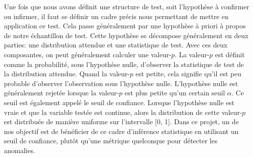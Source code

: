 \noindent Une fois que nous avons définit une structure de test, soit l'hypothèse à confirmer ou infirmer, il faut se définir un cadre précis nous permettant de mettre en application ce test. Cela passe généralement par une hypothèse à priori à propos de notre échantillon de test. Cette hypothèse se décompose généralement en deux parties: une distribution attendue et une statistique de test. Avec ces deux composantes, on peut généralement calculer une valeur-$p$. La valeur-$p$ est définit comme la probabilité, sous l'hypothèse nulle, d'observer la statistique de test de la distribution attendue. Quand la valeur-$p$ est petite, cela signifie qu'il est peu probable d'observer l'observation sous l'hypothèse nulle. L'hypothèse nulle est généralement rejetée lorsque la valeur-$p$ est plus petite qu'un certain seuil $\alpha$. Ce seuil est également appelé le seuil de confiance. Lorsque l'hypothèse nulle est vraie et que la variable testée est continue, alors la distribution de cette valeur-$p$ est distribuée de manière uniforme sur l'intervalle [0, 1]. Dans ce projet, un de nos objectif est de bénéficier de ce cadre d'inférence statistique en utilisant un seuil de confiance, plutôt qu'une métrique quelconque pour détecter les anomalies.

